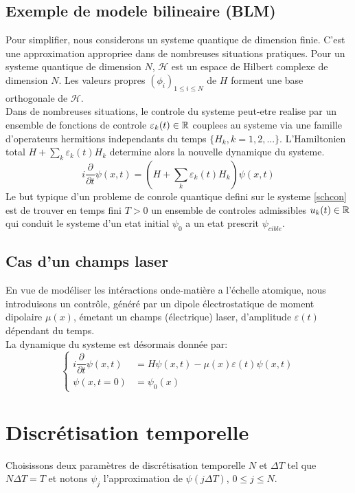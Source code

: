 \subsection{Exemple de modele bilineaire (BLM)}
Pour simplifier, nous considerons un systeme quantique de dimension finie. C'est une approximation appropriee dans de nombreuses situations pratiques. Pour un systeme quantique de dimension $N$, $\mathcal{H}$ est un espace de Hilbert complexe de dimension $N$. Les valeurs propres $(\phi_{i})_{1 \leq i \leq N}$ de $H$ forment une base orthogonale de $\mathcal{H}$.\\
Dans de nombreuses situations, le controle du systeme peut-etre realise par un ensemble de fonctions de controle $\varepsilon_{k}(t) \in \mathbb R$ couplees au systeme via une famille d'operateurs hermitions independants du temps $\{H_k, k=1,2,...\}$. L'Hamiltonien total $H+\sum_{k} \varepsilon_{k}(t)H_k$ determine alors la nouvelle dynamique du systeme.
\begin{equation} \label{schcon}
i \dfrac{\partial }{\partial t} \psi (x,t) = (H+\sum_{k} \varepsilon_{k}(t)H_k)\psi (x,t)
\end{equation}
Le but typique d'un probleme de conrole quantique defini sur le systeme \eqref{schcon} est de trouver en temps fini $T > 0$ un ensemble de controles admissibles $u_k(t) \in \mathbb R$ qui conduit le systeme d'un etat initial $\psi_0$ a un etat prescrit $\psi_{cible}$.
\subsection{Cas d'un champs laser}
En vue de modéliser les intéractions onde-matière a l'échelle atomique, nous introduisons un contrôle, généré par un dipole électrostatique de moment dipolaire $\mu (x)$, émetant un champs (électrique) laser, d'amplitude $\varepsilon (t)$ dépendant du temps.\\
La dynamique du systeme est désormais donnée par:
\begin{equation} \label{schcon2}
\begin{cases}
i \dfrac{\partial }{\partial t} \psi (x,t) &= H\psi (x,t)-\mu(x)\varepsilon(t)\psi (x,t) \\
\psi (x,t=0) &= \psi_0(x)
\end{cases}
\end{equation}

\section{Discrétisation temporelle}
Choisissons deux paramètres de discrétisation temporelle $N$ et $\Delta T$ tel que $N \Delta T = T$ et notons $\psi_j$ l'approximation de $\psi(j\Delta T)$, $0 \leq j \leq N$.
